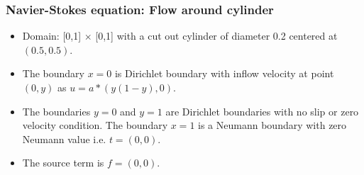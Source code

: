 \documentclass{beamer}
\begin{document}
\begin{frame}
\frametitle{Navier-Stokes equation: Flow around cylinder}
\begin{itemize}
\item Domain: [0,1] $\times$ [0,1] with a cut out cylinder of diameter 0.2 centered at $(0.5,0.5)$.
\item The boundary ${x=0}$ is Dirichlet boundary with inflow velocity at point $(0,y)$ as $u = a*(y(1-y), 0)$. 
\item The boundaries ${y = 0}$ and ${y = 1}$ are Dirichlet boundaries with no slip or zero velocity condition. The boundary ${x = 1}$ is a Neumann boundary with zero Neumann value i.e. $t = (0, 0)$. 
\item The source term is $f = (0, 0)$.
\end{itemize}
\end{frame}
\end{document}
